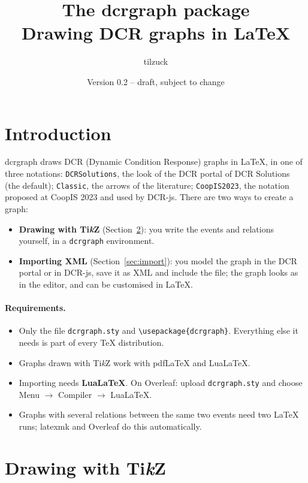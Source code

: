 \documentclass[a4paper,11pt]{article}
\title{The \textsf{dcrgraph} package\\[4pt]
  \large Drawing DCR graphs in \LaTeX}
\author{tilzuck}
\date{Version 0.2 -- draft, subject to change}
\newcommand\cs[1]{\texttt{\textbackslash#1}}
\begin{document}
\maketitle
\tableofcontents

\section{Introduction}

\textsf{dcrgraph} draws DCR (Dynamic Condition Response) graphs in
\LaTeX, in one of three notations: \texttt{DCRSolutions}, the look of the
DCR portal of DCR Solutions (the default); \texttt{Classic}, the arrows of the
literature; \texttt{CoopIS2023}, the notation proposed at CoopIS 2023 and used
by DCR-js. There are two ways to create a graph:
\begin{itemize}
  \item \textbf{Drawing with Ti\emph{k}Z} (Section~\ref{sec:tikz}): you write
    the events and relations yourself, in a \texttt{dcrgraph} environment.
  \item \textbf{Importing XML} (Section~\ref{sec:import}): you model the graph
    in the DCR portal or in DCR-js, save it as XML and include the file;
    the graph looks as in the editor, and can be customised in \LaTeX.
\end{itemize}

\paragraph{Requirements.}
\begin{itemize}
  \item Only the file \texttt{dcrgraph.sty} and \cs{usepackage\{dcrgraph\}}.
    Everything else it needs is part of every \TeX{} distribution.
  \item Graphs drawn with Ti\emph{k}Z work with pdf\LaTeX{} and Lua\LaTeX.
  \item Importing needs \textbf{Lua\LaTeX}. On Overleaf: upload
    \texttt{dcrgraph.sty} and choose Menu $\to$ Compiler $\to$ LuaLaTeX.
  \item Graphs with several relations between the same two events need two
    \LaTeX{} runs; latexmk and Overleaf do this automatically.
\end{itemize}

\section{\texorpdfstring{Drawing with Ti\emph{k}Z}{Drawing with TikZ}}\label{sec:tikz}
\end{document}

